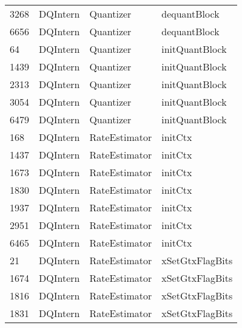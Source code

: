 \begin{tabular}{llll}
3268 &              DQIntern &                  Quantizer &                              dequantBlock \\
6656 &              DQIntern &                  Quantizer &                              dequantBlock \\
64   &              DQIntern &                  Quantizer &                            initQuantBlock \\
1439 &              DQIntern &                  Quantizer &                            initQuantBlock \\
2313 &              DQIntern &                  Quantizer &                            initQuantBlock \\
3054 &              DQIntern &                  Quantizer &                            initQuantBlock \\
6479 &              DQIntern &                  Quantizer &                            initQuantBlock \\
168  &              DQIntern &              RateEstimator &                                   initCtx \\
1437 &              DQIntern &              RateEstimator &                                   initCtx \\
1673 &              DQIntern &              RateEstimator &                                   initCtx \\
1830 &              DQIntern &              RateEstimator &                                   initCtx \\
1937 &              DQIntern &              RateEstimator &                                   initCtx \\
2951 &              DQIntern &              RateEstimator &                                   initCtx \\
6465 &              DQIntern &              RateEstimator &                                   initCtx \\
21   &              DQIntern &              RateEstimator &                           xSetGtxFlagBits \\
1674 &              DQIntern &              RateEstimator &                           xSetGtxFlagBits \\
1816 &              DQIntern &              RateEstimator &                           xSetGtxFlagBits \\
1831 &              DQIntern &              RateEstimator &                           xSetGtxFlagBits \\

\end{tabular}
